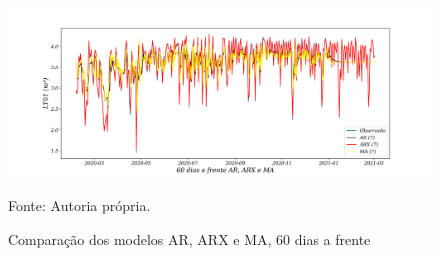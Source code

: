 \begin{figure}[H]
	\centering
	\caption{Comparação dos modelos AR, ARX e MA, 60 dias a frente }
	\label{fig:60-AR-ARX-MA24}
	\includegraphics[width=1\linewidth]{Apendices/Figuras/modelagem-24h/60-AR-ARX-MA}
	
	Fonte: Autoria própria.
\end{figure}

